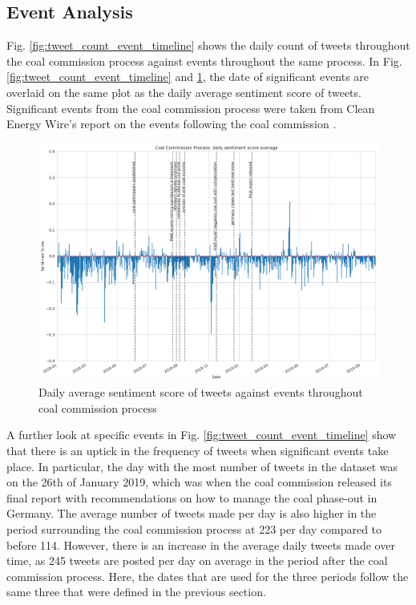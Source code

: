 \documentclass[12pt,onecolumn,twoside]{layout}
\begin{document}
\subsection*{Event Analysis}
Fig. \ref{fig:tweet_count_event_timeline} shows the daily count of tweets throughout the coal commission process against events throughout the same process. In Fig. \ref{fig:tweet_count_event_timeline} and \ref{fig:tweet_score_event_timeline}, the date of significant events are overlaid on the same plot as the daily average sentiment score of tweets. Significant events from the coal commission process were taken from Clean Energy Wire's report on the events following the coal commission \cite{Amelang2019}. 
 
\begin{figure} 
	\begin{center}
		\includegraphics[width=\textwidth]{figures/sa_tweet_score_event_timeline}
	\end{center}
	\caption{Daily average sentiment score of tweets against events throughout coal commission process}
	\label{fig:tweet_score_event_timeline}
\end{figure}

A further look at specific events in Fig. \ref{fig:tweet_count_event_timeline} show that there is an uptick in the frequency of tweets when significant events take place. In particular, the day with the most number of tweets in the dataset was on the 26th of January 2019, which was when the coal commission released its final report with recommendations on how to manage the coal phase-out in Germany. The average number of tweets made per day is also higher in the period surrounding the coal commission process at 223 per day compared to before 114. However, there is an increase in the average daily tweets made over time, as 245 tweets are posted per day on average in the period after the coal commission process. Here, the dates that are used for the three periods follow the same three that were defined in the previous section. 
\end{document}
